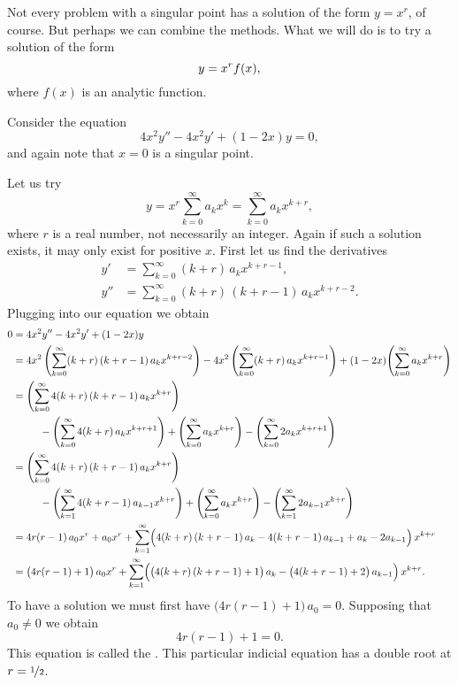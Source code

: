 Not every problem with a singular point has a solution of the form $y=x^r$, of
course.  But perhaps we can combine the methods.  What we will do is
to try a solution of the form
\begin{equation*}
y = x^r f(x) ,
\avoidbreak
\end{equation*}
where $f(x)$ is an analytic function.

\begin{example}
Consider the equation
\begin{equation*}
4 x^2 y'' - 4 x^2 y' + (1-2x)y = 0,
\end{equation*}
and again note that $x=0$ is a singular point.

Let us try
\begin{equation*}
y = x^r \sum_{k=0}^\infty a_k x^k
= \sum_{k=0}^\infty a_k x^{k+r} ,
\end{equation*}
where $r$ is a real number, not necessarily an integer.
Again if such a solution exists, it may only exist for positive $x$.
First let us find the derivatives
\begin{align*}
y' & = \sum_{k=0}^\infty (k+r)\, a_k x^{k+r-1} , \\
y'' & = \sum_{k=0}^\infty (k+r)\,(k+r-1)\, a_k x^{k+r-2} .
\end{align*}
Plugging into our equation we obtain
\begin{equation*}
\begin{split}
0 & = 4x^2y''-4x^2y'+(1-2x)y
\\
&= 
4x^2 \, \Biggl( \sum_{k=0}^\infty (k+r)\,(k+r-1) \, a_k x^{k+r-2}  \Biggr)
-
4x^2 \, \Biggl( \sum_{k=0}^\infty (k+r) \, a_k x^{k+r-1}  \Biggr)
+
(1-2x)
\Biggl( \sum_{k=0}^\infty a_k x^{k+r} \Biggr)
\\
&=
\Biggl( \sum_{k=0}^\infty 4 (k+r)\,(k+r-1) \, a_k x^{k+r}  \Biggr)
\\
& \phantom{mmm}
-
\Biggl( \sum_{k=0}^\infty 4 (k+r) \, a_k x^{k+r+1}  \Biggr)
+
\Biggl( \sum_{k=0}^\infty a_k x^{k+r} \Biggr)
-
\Biggl( \sum_{k=0}^\infty 2a_k x^{k+r+1} \Biggr)
\\
&=
\Biggl( \sum_{k=0}^\infty 4 (k+r)\,(k+r-1) \, a_k x^{k+r}  \Biggr)
\\
& \phantom{mmm}
-
\Biggl( \sum_{k=1}^\infty 4 (k+r-1) \, a_{k-1} x^{k+r}  \Biggr)
+
\Biggl( \sum_{k=0}^\infty a_k x^{k+r} \Biggr)
-
\Biggl( \sum_{k=1}^\infty 2a_{k-1} x^{k+r} \Biggr)
\\
&=
4r(r-1) \, a_0 x^r  + a_0 x^r + 
\sum_{k=1}^\infty
\Bigl( 4 (k+r)\,(k+r-1) \, a_k
-
4 (k+r-1) \, a_{k-1}
+
a_k
-
2a_{k-1} \Bigr) \, x^{k+r} 
\\
&=
\bigl( 4r(r-1) + 1 \bigr) \, a_0 x^r + 
\sum_{k=1}^\infty
\Bigl( \bigl( 4 (k+r)\,(k+r-1) + 1 \bigr) \, a_k
-
\bigl( 4 (k+r-1) + 2 \bigr) \, a_{k-1} \Bigr) \, x^{k+r} .
\end{split}
\end{equation*}
To have a solution we must first have
$\bigl( 4r(r-1) + 1 \bigr) \, a_0 = 0$.  Supposing that $a_0 \not= 0$
we obtain 
\begin{equation*}
4r(r-1) + 1 = 0 .
\end{equation*}
This equation is called the \emph{}.
This particular indicial
equation has a double root at $r = \nicefrac{1}{2}$.


\end{example}

